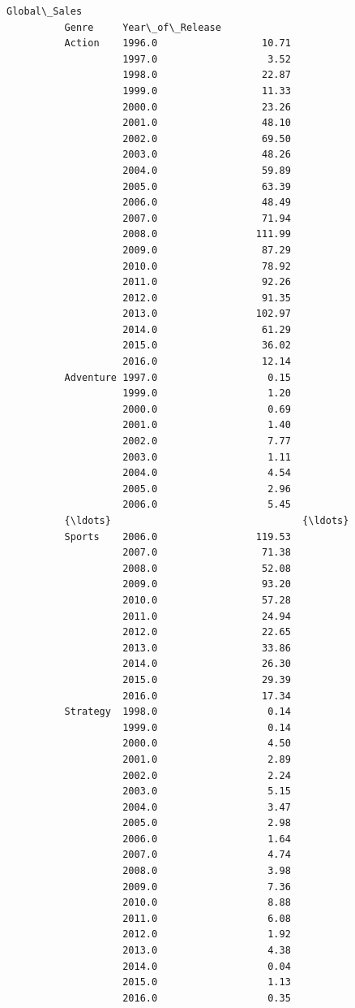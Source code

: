 \documentclass[11pt]{article}
\begin{document}
\begin{Verbatim}[commandchars=\\\{\}]
                                     Global\_Sales  
          Genre     Year\_of\_Release                
          Action    1996.0                  10.71  
                    1997.0                   3.52  
                    1998.0                  22.87  
                    1999.0                  11.33  
                    2000.0                  23.26  
                    2001.0                  48.10  
                    2002.0                  69.50  
                    2003.0                  48.26  
                    2004.0                  59.89  
                    2005.0                  63.39  
                    2006.0                  48.49  
                    2007.0                  71.94  
                    2008.0                 111.99  
                    2009.0                  87.29  
                    2010.0                  78.92  
                    2011.0                  92.26  
                    2012.0                  91.35  
                    2013.0                 102.97  
                    2014.0                  61.29  
                    2015.0                  36.02  
                    2016.0                  12.14  
          Adventure 1997.0                   0.15  
                    1999.0                   1.20  
                    2000.0                   0.69  
                    2001.0                   1.40  
                    2002.0                   7.77  
                    2003.0                   1.11  
                    2004.0                   4.54  
                    2005.0                   2.96  
                    2006.0                   5.45  
          {\ldots}                                 {\ldots}  
          Sports    2006.0                 119.53  
                    2007.0                  71.38  
                    2008.0                  52.08  
                    2009.0                  93.20  
                    2010.0                  57.28  
                    2011.0                  24.94  
                    2012.0                  22.65  
                    2013.0                  33.86  
                    2014.0                  26.30  
                    2015.0                  29.39  
                    2016.0                  17.34  
          Strategy  1998.0                   0.14  
                    1999.0                   0.14  
                    2000.0                   4.50  
                    2001.0                   2.89  
                    2002.0                   2.24  
                    2003.0                   5.15  
                    2004.0                   3.47  
                    2005.0                   2.98  
                    2006.0                   1.64  
                    2007.0                   4.74  
                    2008.0                   3.98  
                    2009.0                   7.36  
                    2010.0                   8.88  
                    2011.0                   6.08  
                    2012.0                   1.92  
                    2013.0                   4.38  
                    2014.0                   0.04  
                    2015.0                   1.13  
                    2016.0                   0.35  
          

\end{Verbatim}
\end{document}
